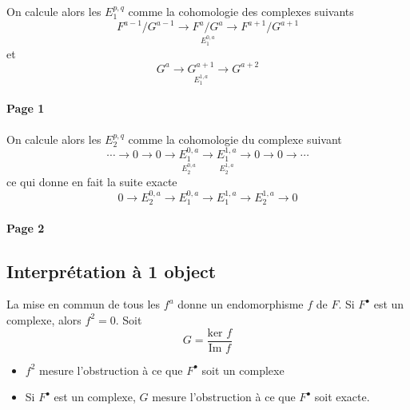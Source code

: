 \documentclass[11pt,draft,makeidx]{amsart}
\begin{document}
On calcule alors les $E_1^{p,q}$ comme la cohomologie des complexes suivants
\[
 F^{a-1}/G^{a-1} \longrightarrow \underset{E^{0,a}_1}{F^a/G^a} \longrightarrow F^{a+1}/G^{a+1}
\]
et
\[
G^a \longrightarrow \underset{E^{1,a}_1}{G^{a+1}} \longrightarrow G^{a+2}
\]

\paragraph{\textbf{Page 1}}
\begin{center}
\end{center}



On calcule alors les $E_2^{p,q}$ comme la cohomologie du complexe suivant
\[
\cdots \to 0 \to 0 \to  \underset{E_2^{0,a}}{E_1^{0,a}} \to \underset{E_2^{1,a}}{E_1^{1,a}} \to 0 \to 0 \to \cdots
\]
ce qui donne en fait la suite exacte
\[
0 \to E^{0,a}_2 \to  E_1^{0,a} \to E_1^{1,a} \to E^{1,a}_2 \to 0
\]


\paragraph{\textbf{Page 2}}
\begin{center}
\end{center}


\subsection{Interprétation à 1 object}
La mise en commun de tous les $f^a$ donne un endomorphisme $f$ de $F$. Si $F^\bullet$ est un complexe, alors $f^2 = 0$. Soit
\[
G = \dfrac{\text{ker }f}{\text{Im }f}
\]

\begin{itemize}
\item
$f^2$ mesure l'obstruction à ce que $F^\bullet$ soit un complexe
\item
Si $F^\bullet$ est un complexe, $G$ mesure l'obstruction à ce que $F^\bullet$ soit exacte.
\end{itemize}
\end{document}
